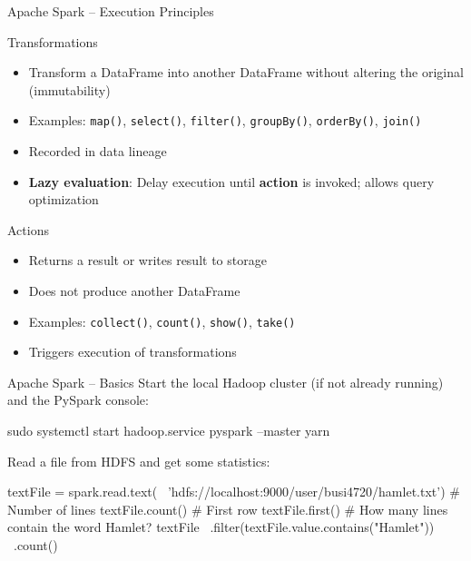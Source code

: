 \documentclass[ignorenonframetext,xcolor=x11names]{beamer}
\begin{document}
\begin{frame}[label=advanced]{Apache Spark -- Execution Principles}
\begin{block}{Transformations}
\begin{itemize}
\item Transform a DataFrame into another DataFrame without altering the original (immutability)
\item Examples: \texttt{map()}, \texttt{select()}, \texttt{filter()}, \texttt{groupBy()}, \texttt{orderBy()}, \texttt{join()}
\item Recorded in data lineage
\item \textbf{Lazy evaluation}: Delay execution until \textbf{action} is invoked; allows query optimization
\end{itemize}
\end{block}
\begin{block}{Actions}
\begin{itemize}
\item Returns a result or writes result to storage
\item Does not produce another DataFrame
\item Examples: \texttt{collect()}, \texttt{count()}, \texttt{show()}, \texttt{take()}
\item Triggers execution of transformations
\end{itemize}
\end{block}
\end{frame}

\begin{frame}[label=withcode,fragile]{Apache Spark -- Basics}
Start the local Hadoop cluster (if not already running) and the PySpark console:
\begin{bashcode}
sudo systemctl start hadoop.service
pyspark --master yarn
\end{bashcode}
Read a file from HDFS and get some statistics:
\begin{pythoncode}
textFile = spark.read.text( \
    'hdfs://localhost:9000/user/busi4720/hamlet.txt')
# Number of lines
textFile.count() 
# First row
textFile.first()
# How many lines contain the word Hamlet?
textFile \
    .filter(textFile.value.contains("Hamlet")) \
    .count() 
\end{pythoncode}
\end{frame}
 
\end{document}
